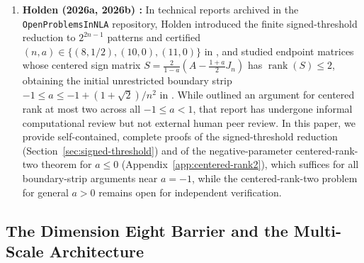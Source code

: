 \documentclass[11pt,reqno]{article}
\theoremstyle{definition}
\newcommand{\rank}{\operatorname{rank}}
\begin{document}
\begin{enumerate}
    \item \textbf{Holden (2026a, 2026b) \cite{holden2026a, holden2026b}:} In technical reports archived in the \texttt{OpenProblemsInNLA} repository, Holden introduced the finite signed-threshold reduction to $2^{2n-1}$ patterns and certified $(n, a) \in \{(8, 1/2), (10, 0), (11, 0)\}$ in \cite{holden2026a}, and studied endpoint matrices whose centered sign matrix $S = \frac{2}{1-a}(A - \frac{1+a}{2}J_n)$ has $\rank(S) \le 2$, obtaining the initial unrestricted boundary strip $-1 \le a \le -1 + (1+\sqrt{2})/n^2$ in \cite{holden2026b}. While \cite{holden2026b} outlined an argument for centered rank at most two across all $-1 \le a < 1$, that report has undergone informal computational review but not external human peer review. In this paper, we provide self-contained, complete proofs of the signed-threshold reduction (Section~\ref{sec:signed-threshold}) and of the negative-parameter centered-rank-two theorem for $a \le 0$ (Appendix~\ref{app:centered-rank2}), which suffices for all boundary-strip arguments near $a = -1$, while the centered-rank-two problem for general $a > 0$ remains open for independent verification.
\end{enumerate}

\subsection{The Dimension Eight Barrier and the Multi-Scale Architecture}\label{sec:barrier-architecture}
\end{document}
